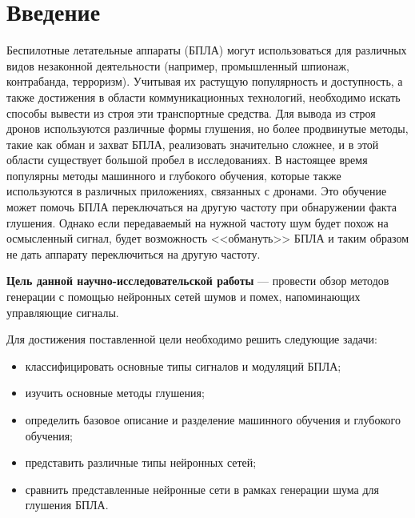\chapter*{Введение}

Беспилотные летательные аппараты (БПЛА) могут использоваться для различных видов незаконной деятельности (например, промышленный шпионаж, контрабанда, терроризм). Учитывая их растущую популярность и доступность, а также достижения в области коммуникационных технологий, необходимо искать способы вывести из строя эти транспортные средства. Для вывода из строя дронов используются различные формы глушения, но более продвинутые методы, такие как обман и захват БПЛА, реализовать значительно сложнее, и в этой области существует большой пробел в исследованиях. В настоящее время популярны методы машинного и глубокого обучения, которые также используются в различных приложениях, связанных с дронами. Это обучение может помочь БПЛА переключаться на другую частоту при обнаружении факта глушения. Однако если передаваемый на нужной частоту шум будет похож на осмысленный сигнал, будет возможность <<обмануть>> БПЛА и таким образом не дать аппарату переключиться на другую частоту.

\textbf{Цель данной научно-исследовательской работы} --- провести обзор методов генерации с помощью нейронных сетей шумов и помех, напоминающих управляющие сигналы.


Для достижения поставленной цели необходимо решить следующие задачи:
\begin{itemize}
	\item классифицировать основные типы сигналов и модуляций БПЛА;
	\item изучить основные методы глушения;
	\item определить базовое описание и разделение машинного обучения и глубокого обучения;
	\item представить различные типы нейронных сетей;
	\item сравнить представленные нейронные сети в рамках генерации шума для глушения БПЛА.
\end{itemize}